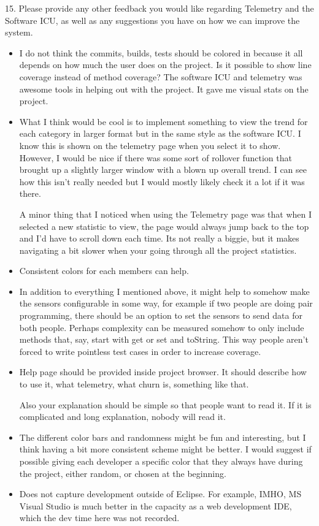 \documentclass[11pt]{article}
\begin{document}
15. Please provide any other feedback you would like regarding 
Telemetry and the Software ICU, as well as any suggestions 
you have on how we can improve the system. 
\begin{itemize}
\item I do not think the commits, builds, tests should be colored in because it all depends on how much the user does on the project.  Is it possible to show line coverage instead of method coverage? The software ICU and telemetry was awesome tools in helping out with the project.  It gave me visual stats on the project.
\item What I think would be cool is to implement something to view the trend for each category in larger format but in the same style as the software ICU. I know this is shown on the telemetry page when you select it to show. However, I would be nice if there was some sort of rollover function that brought up a slightly larger window with a blown up overall trend. I can see how this isn't really needed but I would mostly likely check it a lot if it was there. 

A minor thing that I noticed when using the Telemetry page was that when I selected a new statistic to view, the page would always jump back to the top and I'd have to scroll down each time. Its not really a biggie, but it makes navigating a bit slower when your going through all the project statistics.
\item Consistent colors for each members can help.
\item In addition to everything I mentioned above, it might help to somehow make the sensors configurable in some way, for example if two people are doing pair programming, there should be an option to set the sensors to send data for both people. Perhaps complexity can be measured somehow to only include methods that, say, start with get or set and toString. This way people aren't forced to write pointless test cases in order to increase coverage. 
\item Help page should be provided inside project browser. It should describe how to use it, what telemetry, what churn is, something like that. 

Also your explanation should be simple so that people want to read it. If it is complicated and long explanation, nobody will read it. 
\item The different color bars and randomness might be fun and interesting, but I think having a bit more consistent scheme might be better.  I would suggest if possible giving each developer a specific color that they always have during the project, either random, or chosen at the beginning.
\item Does not capture development outside of Eclipse.  For example, IMHO, MS Visual Studio is much better in the capacity as a web development IDE, which the dev time here was not recorded.
\end{itemize}
\end{document}
